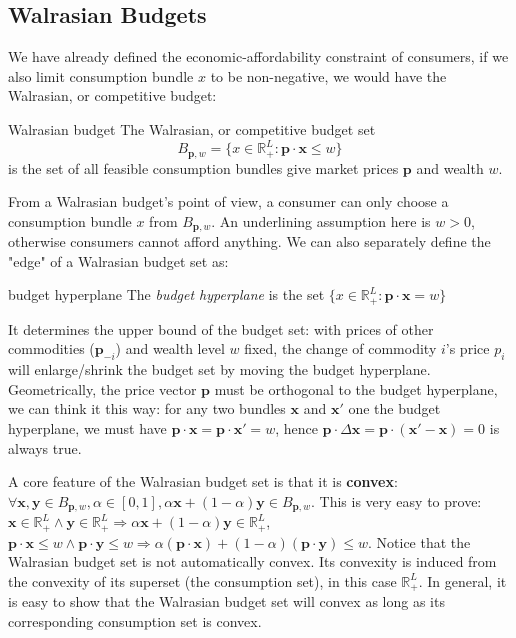 \subsection{Walrasian Budgets}
We have already defined the economic-affordability constraint of consumers, if we also limit consumption bundle $x$ to be non-negative, we would have the Walrasian, or competitive budget:

\begin{definition}{Walrasian budget}{}
    The Walrasian, or competitive budget set $$B_{\mathbf{p},w}=\{x\in\mathbb{R}^L_+:\mathbf{p}\cdot\mathbf{x}\leq w\}$$ is the set of all feasible consumption bundles give market prices $\mathbf{p}$ and wealth $w$.
\end{definition}

From a Walrasian budget's point of view, a consumer can only choose a consumption bundle $x$ from $B_{\mathbf{p},w}$. An underlining assumption here is $w>0$, otherwise consumers cannot afford anything. We can also
separately define the "edge" of a Walrasian budget set as:
\begin{definition}{budget hyperplane}{}
    The \textit{budget hyperplane} is the set $\{x\in\mathbb{R}^L_+:\mathbf{p}\cdot\mathbf{x}=w\}$
\end{definition}
It determines the upper bound of the budget set: with prices of other commodities ($\mathbf{p}_{-i}$) and wealth level $w$ fixed, the change of commodity $i$'s price $p_i$ will enlarge/shrink the budget set by moving the budget hyperplane.
Geometrically, the price vector $\mathbf{p}$ must be orthogonal to the budget hyperplane, we can think it this way: for any two bundles $\mathbf{x}$ and $\mathbf{x}'$ one the budget hyperplane, we must have $\mathbf{p}\cdot\mathbf{x}=\mathbf{p}\cdot\mathbf{x}'=w$, hence
$\mathbf{p}\cdot\Delta\mathbf{x}=\mathbf{p}\cdot(\mathbf{x}'-\mathbf{x})=0$ is always true.

A core feature of the Walrasian budget set is that it is \textbf{convex}: $\forall \mathbf{x},\mathbf{y}\in B_{\mathbf{p},w}, \alpha\in[0,1], \alpha\mathbf{x}+(1-\alpha)\mathbf{y}\in B_{\mathbf{p},w}$. This is very easy to prove: $\mathbf{x}\in\mathbb{R}^L_+\land\mathbf{y}\in\mathbb{R}^L_+\Rightarrow \alpha\mathbf{x}+(1-\alpha)\mathbf{y}\in \mathbb{R}^L_+$, $\mathbf{p}\cdot\mathbf{x}\leq w\land\mathbf{p}\cdot \mathbf{y}\leq w\Rightarrow \alpha(\mathbf{p}\cdot\mathbf{x})+(1-\alpha)(\mathbf{p}\cdot\mathbf{y})\leq w$.
Notice that the Walrasian budget set is not automatically convex. Its convexity is induced from the convexity of its superset (the consumption set), in this case $\mathbb{R}^L_+$. In general, it is easy to show that the Walrasian budget set will convex as long as its corresponding consumption set is convex.

